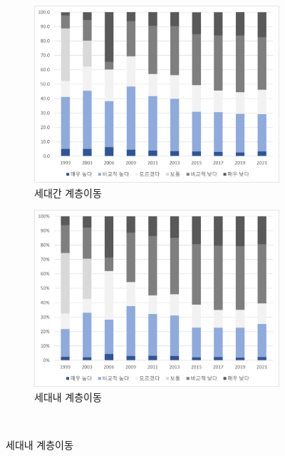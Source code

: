 \begin{figure}
    \centering
    \caption{계층이동 가능성에 대한 사회인식 추이}
    \begin{subfigure}[b]{0.45\textwidth}
        \centering
        \includegraphics[width=\textwidth]{figure/kosis_intermobility_99-21.png}
        \caption{세대간 계층이동}
    \end{subfigure}
    \hfill
    \begin{subfigure}[b]{0.45\textwidth}
        \centering
        \includegraphics[width=\textwidth]{figure/kosis_intramobility_99-21.png}
        \caption{세대내 계층이동}
    \end{subfigure}
    \\
    \label{fig:intermobility}
\end{figure}

